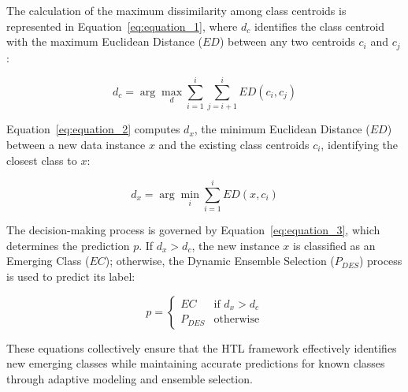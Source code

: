 The calculation of the maximum dissimilarity among class centroids is represented in Equation~\ref{eq:equation_1}, where \( d_c \) identifies the class centroid with the maximum Euclidean Distance (\( ED \)) between any two centroids \( c_i \) and \( c_j \):

\begin{equation}
	\label{eq:equation_1}
	d_c = \arg\max_d \sum_{i=1}^{i} \sum_{j=i+1}^{i}  ED(c_i, c_j)
\end{equation}

Equation~\ref{eq:equation_2} computes \( d_x \), the minimum Euclidean Distance (\( ED \)) between a new data instance \( x \) and the existing class centroids \( c_i \), identifying the closest class to \( x \):

\begin{equation}
	\label{eq:equation_2}
	d_x = \arg\min_i \sum_{i=1}^{i} ED(x, c_i)
\end{equation}

The decision-making process is governed by Equation~\ref{eq:equation_3}, which determines the prediction \( p \). If \( d_x > d_c \), the new instance \( x \) is classified as an Emerging Class (\( EC \)); otherwise, the Dynamic Ensemble Selection (\( P_{DES} \)) process is used to predict its label:

\begin{equation}
	\label{eq:equation_3}
	p=
	\begin{cases}
		EC & \text{if } d_x > d_c \\
		P_{DES} & \text{otherwise}
	\end{cases}
\end{equation}

These equations collectively ensure that the HTL framework effectively identifies new emerging classes while maintaining accurate predictions for known classes through adaptive modeling and ensemble selection.

